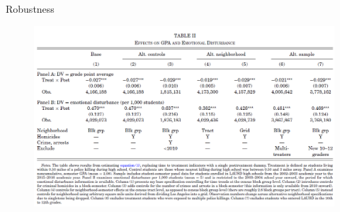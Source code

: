 \documentclass[dvipdfmx]{beamer}
\begin{document}
\begin{frame}{Robustness}
  \begin{figure}
    \centering
    \includegraphics[scale = .55]{fig_tab/os20220113/T2}
  \end{figure}
\end{frame}
\end{document}

